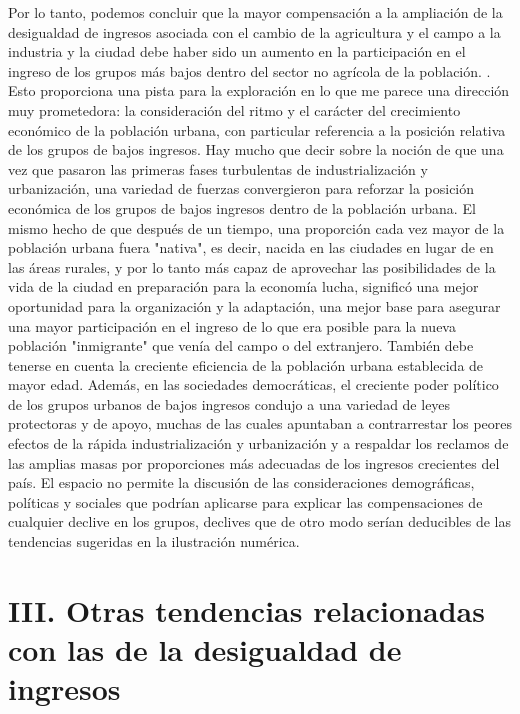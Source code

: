 Por lo tanto, podemos concluir que la mayor compensación a la ampliación de la desigualdad de ingresos asociada con el cambio de la agricultura y el campo a la industria y la ciudad debe haber sido un aumento en la participación en el ingreso de los grupos más bajos dentro del sector no agrícola de la población. . Esto proporciona una pista para la exploración en lo que me parece una dirección muy prometedora: la consideración del ritmo y el carácter del crecimiento económico de la población urbana, con particular referencia a la posición relativa de los grupos de bajos ingresos. Hay mucho que decir sobre la noción de que una vez que pasaron las primeras fases turbulentas de industrialización y urbanización, una variedad de fuerzas convergieron para reforzar la posición económica de los grupos de bajos ingresos dentro de la población urbana. El mismo hecho de que después de un tiempo, una proporción cada vez mayor de la población urbana fuera "nativa", es decir, nacida en las ciudades en lugar de en las áreas rurales, y por lo tanto más capaz de aprovechar las posibilidades de la vida de la ciudad en preparación para la economía lucha, significó una mejor oportunidad para la organización y la adaptación, una mejor base para asegurar una mayor participación en el ingreso de lo que era posible para la nueva población "inmigrante" que venía del campo o del extranjero. También debe tenerse en cuenta la creciente eficiencia de la población urbana establecida de mayor edad. Además, en las sociedades democráticas, el creciente poder político de los grupos urbanos de bajos ingresos condujo a una variedad de leyes protectoras y de apoyo, muchas de las cuales apuntaban a contrarrestar los peores efectos de la rápida industrialización y urbanización y a respaldar los reclamos de las amplias masas por proporciones más adecuadas de los ingresos crecientes del país. El espacio no permite la discusión de las consideraciones demográficas, políticas y sociales que podrían aplicarse para explicar las compensaciones de cualquier declive en los grupos, declives que de otro modo serían deducibles de las tendencias sugeridas en la ilustración numérica.


\section*{\centering III. Otras tendencias relacionadas con las de la desigualdad de ingresos}

